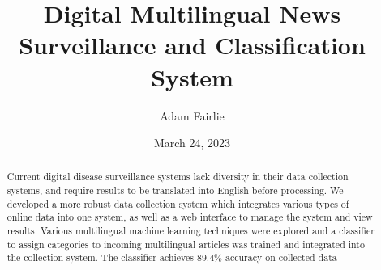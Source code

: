 \documentclass{l4proj}
\begin{document}
\title{Digital Multilingual News Surveillance and Classification System}
\author{Adam Fairlie}
\date{March 24, 2023}

\maketitle

\begin{abstract}
    Current digital disease surveillance systems lack diversity in their data collection systems, and require results to be translated into English before processing. We developed a more robust data collection system which integrates various types of online data into one system, as well as a web interface to manage the system and view results. Various multilingual machine learning techniques were explored and a classifier to assign categories to incoming multilingual articles was trained and integrated into the collection system. The classifier achieves 89.4\% accuracy on collected data
\end{abstract}


%
%
%
\educationalconsent


\tableofcontents
\end{document}
